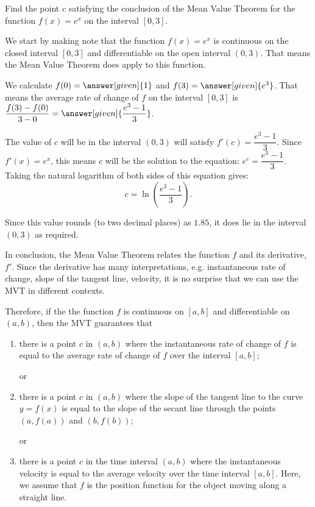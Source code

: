 \documentclass{ximera}
\begin{document}
\begin{example}
	Find the point $c$ satisfying the conclusion of the Mean Value Theorem for the function $f(x) = e^x$ on the interval $[0, 3]$.
	\begin{explanation}
		We start by making note that the function $f(x)=e^x$ is continuous on the closed interval $[0, 3]$ and differentiable on the
		open interval $(0, 3)$. That means the Mean Value Theorem does apply to this function.
		
		We calculate $f(0) = \answer[given]{1}$ and $f(3)=\answer[given]{e^3}$. That means the average rate of change of $f$
		on the interval $[0, 3]$ is $\dfrac{f(3)-f(0)}{3-0}=\answer[given]{\dfrac{e^3-1}{3}}$.

		The value of $c$ will be in the interval $(0, 3)$ will satisfy $f'(c) = \dfrac{e^3-1}{3}$.
		Since $f'(x) = e^x$, this means $c$ will be the solution to the equation:
		$\displaystyle  e^c = \dfrac{e^3-1}{3}$. Taking the natural logarithm of both sides of this equation gives:
		\[c = \ln\left( \dfrac{e^3-1}{3} \right). \]

		Since this value rounds (to two decimal places) as $1.85$, it does lie in the interval $(0,3)$ as required.
	\end{explanation}

\end{example}


In conclusion, the Mean Value Theorem relates the function $f$ and its derivative, $f'$. Since the derivative has many interpretations,
 e.g. instantaneous rate of change, slope of the tangent line, velocity, it is no surprise that we can use the MVT in different contexts.

Therefore, if the the function $f$ is continuous on $[a,b]$ and differentiable on $(a,b)$, then the MVT guarantees that
\begin{enumerate}
	\item there is a point $c$ in $(a,b)$ where the instantaneous rate of change of $f$ is equal to the average 
		rate of change of $f$ over the interval $[a,b]$;

	or

	\item there is a point $c$ in $(a,b)$ where the slope of the tangent line to the curve $y=f(x)$ is equal to the 
		slope of the secant line through the points $(a,f(a))$  and $(b,f(b))$; 

	or

	\item there is a point $c$ in the time interval $(a,b)$ where the instantaneous velocity is equal to the average 
		velocity over the time interval $[a,b]$. Here, we assume that $f$ is the position function for the object moving along a straight line.
\end{enumerate}
\end{document}
